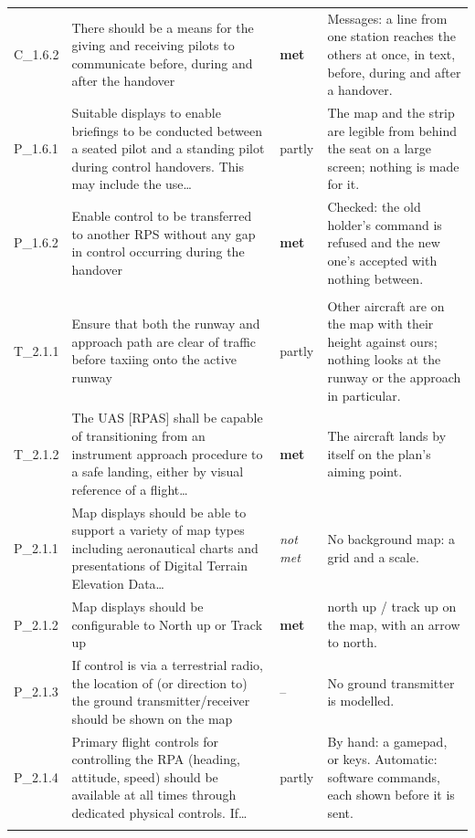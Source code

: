 \begin{longtable}{@{}>{\raggedright\arraybackslash}p{12mm}>{\raggedright\arraybackslash}p{57mm}>{\raggedright\arraybackslash}p{13mm}>{\raggedright\arraybackslash}p{70mm}@{}}
C\_1.6.2 & There should be a means for the giving and receiving pilots to communicate before, during and after the handover & \textbf{met} & Messages: a line from one station reaches the others at once, in text, before, during and after a handover. \\
P\_1.6.1 & Suitable displays to enable briefings to be conducted between a seated pilot and a standing pilot during control handovers. This may include the use\ldots{} & partly & The map and the strip are legible from behind the seat on a large screen; nothing is made for it. \\
P\_1.6.2 & Enable control to be transferred to another RPS without any gap in control occurring during the handover & \textbf{met} & Checked: the old holder's command is refused and the new one's accepted with nothing between. \\
\addlinespace\multicolumn{4}{@{}l}{\textbf{Location and flight path}} \\
T\_2.1.1 & Ensure that both the runway and approach path are clear of traffic before taxiing onto the active runway & partly & Other aircraft are on the map with their height against ours; nothing looks at the runway or the approach in particular. \\
T\_2.1.2 & The UAS [RPAS] shall be capable of transitioning from an instrument approach procedure to a safe landing, either by visual reference of a flight\ldots{} & \textbf{met} & The aircraft lands by itself on the plan's aiming point. \\
P\_2.1.1 & Map displays should be able to support a variety of map types including aeronautical charts and presentations of Digital Terrain Elevation Data\ldots{} & \emph{not met} & No background map: a grid and a scale. \\
P\_2.1.2 & Map displays should be configurable to North up or Track up & \textbf{met} & north up / track up on the map, with an arrow to north. \\
P\_2.1.3 & If control is via a terrestrial radio, the location of (or direction to) the ground transmitter/receiver should be shown on the map & -- & No ground transmitter is modelled. \\
P\_2.1.4 & Primary flight controls for controlling the RPA (heading, attitude, speed) should be available at all times through dedicated physical controls. If\ldots{} & partly & By hand: a gamepad, or keys. Automatic: software commands, each shown before it is sent. \\
\addlinespace\multicolumn{4}{@{}l}{\textbf{Terrain, airspace and weather}} \\

\end{longtable}
